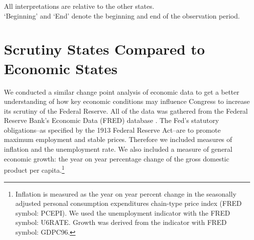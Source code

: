 \documentclass[a4paper]{article}\usepackage[]{graphicx}\usepackage[]{color}
\begin{document}
\begin{table}
    \caption{Summary of Estimated Scrutiny States}
    \label{ObservedTable}

    {\scriptsize{All interpretations are relative to the other states. \\
    `Beginning' and `End' denote the beginning and end of the observation period.}}
\end{table}

\section{Scrutiny States Compared to Economic States}

We conducted a similar change point analysis of economic data to get a better understanding of how key economic conditions may influence Congress to increase its scrutiny of the Federal Reserve. All of the data was gathered from the Federal Reserve Bank's Economic Data (FRED) database \citep{FRED}. The Fed's statutory obligations--as specified by the 1913 Federal Reserve Act--are to promote maximum employment and stable prices. Therefore we included measures of inflation and the unemployment rate. We also included a measure of general economic growth: the year on year percentage change of the gross domestic product per capita.\footnote{Inflation is measured as the year on year percent change in the seasonally adjusted personal consumption expenditures chain-type price index (FRED symbol: PCEPI). We used the unemployment indicator with the FRED symbol: U6RATE. Growth was derived from the indicator with FRED symbol: GDPC96.}
\end{document}
